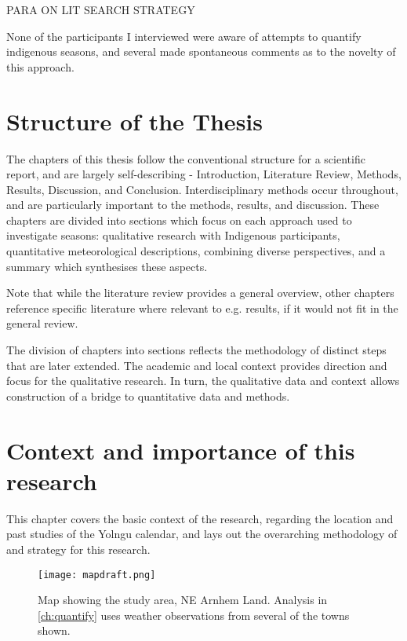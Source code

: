 PARA ON LIT SEARCH STRATEGY

None of the participants I interviewed were aware of attempts to quantify indigenous seasons,
and several made spontaneous comments as to the novelty of this approach.





\section{Structure of the Thesis}

The chapters of this thesis follow the conventional structure for a scientific
report, and are largely self-describing - Introduction, Literature Review,
Methods, Results, Discussion, and Conclusion.
%
Interdisciplinary methods occur throughout, and are particularly important
to the methods, results, and discussion.  These chapters are divided into
sections which focus on each approach used to investigate seasons:
qualitative research with Indigenous participants,
quantitative meteorological descriptions,
combining diverse perspectives, and
a summary which synthesises these aspects.


Note that while the literature review provides a general overview,
other chapters reference specific literature where relevant to e.g.
results, if it would not fit in the general review.

The division of chapters into sections
reflects the methodology of distinct steps that are
later extended.  The academic and local context provides direction and focus
for the qualitative research.  In turn, the qualitative data and context
allows construction of a bridge to quantitative data and methods.




\section{Context and importance of this research}
\label{ch:context}
This chapter covers the basic context of the research,
regarding the location and past studies of the Yolngu calendar,
and lays out the overarching methodology of and strategy for this research.


\begin{figure}[h]
    \centering
    \texttt{[image: mapdraft.png]}
    \caption[Map showing the study area, NE Arnhem Land]{
        Map showing the study area, NE Arnhem Land.
        Analysis in \autoref{ch:quantify} uses weather observations from several of the towns shown.
        }
    \label{fig:arnhem-map}
\end{figure}


